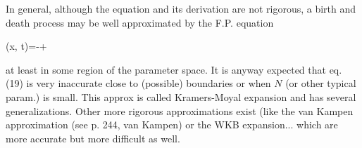 In general, although the equation and its derivation are not rigorous, a birth
and death process may be well approximated by the F.P. equation
\begin{DispWithArrows}[displaystyle, format=c]
  (x, t)=-+ 
\end{DispWithArrows}
at least in some region of the parameter space. It is anyway expected that eq.
(19) is very inaccurate close to (possible) boundaries or when $N$ (or other
typical param.) is small. This approx is called Kramers-Moyal expansion and has
several generalizations. Other more rigorous approximations exist (like the van
Kampen approximation (see p. 244, van Kampen) or the WKB expansion... which are
more accurate but more difficult as well.

